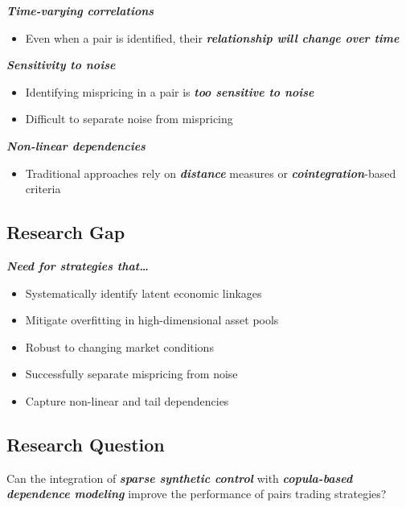 \documentclass[
  letterpaper,
  DIV=11,
  numbers=noendperiod]{scrartcl}
\providecommand{\tightlist}{%
  \setlength{\itemsep}{0pt}\setlength{\parskip}{0pt}}\usepackage{longtable,booktabs,array}
\begin{document}
{\textbf{\emph{Time-varying correlations}}}

\begin{itemize}
\tightlist
\item
  Even when a pair is identified, their \textbf{\emph{relationship will
  change over time}}
\end{itemize}

{\textbf{\emph{Sensitivity to noise}}}

\begin{itemize}
\tightlist
\item
  Identifying mispricing in a pair is \textbf{\emph{too sensitive to
  noise}}
\item
  Difficult to separate noise from mispricing
\end{itemize}

{\textbf{\emph{Non-linear dependencies}}}

\begin{itemize}
\tightlist
\item
  Traditional approaches rely on \textbf{\emph{distance}} measures or
  \textbf{\emph{cointegration}}-based criteria
\end{itemize}

\subsection{Research Gap}\label{research-gap}

{\textbf{\emph{Need for strategies that\ldots{}}}}

\begin{itemize}
\tightlist
\item
  Systematically identify latent economic linkages
\item
  Mitigate overfitting in high-dimensional asset pools
\item
  Robust to changing market conditions
\item
  Successfully separate mispricing from noise
\item
  Capture non-linear and tail dependencies
\end{itemize}

\subsection{Research Question}\label{research-question}

Can the integration of \textbf{\emph{sparse synthetic control}} with
\textbf{\emph{copula-based dependence modeling}} improve the performance
of pairs trading strategies?
\end{document}
